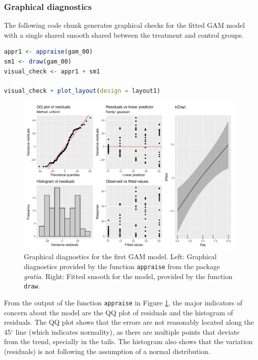 \documentclass[
]{article}
\newcommand{\passthrough}[1]{#1}
\begin{document}
\hypertarget{graphical-diagnostics}{%
\subsubsection{Graphical diagnostics}\label{graphical-diagnostics}}

The following code chunk generates graphical checks for the fitted GAM model with a single shared smooth shared between the treatment and control groups.

\begin{lstlisting}[language=R]
appr1 <- appraise(gam_00)
sm1 <- draw(gam_00)
visual_check <- appr1 + sm1

visual_check + plot_layout(design = layout1)
\end{lstlisting}

\begin{figure}

{\centering \includegraphics[width=0.75\linewidth]{Appendix_A_files/figure-latex/first-GAM-diag-1} 

}

\caption{Graphical diagnostics for the first GAM model. Left: Graphical diagnostics provided by the function \passthrough{\lstinline!appraise!} from the package \emph{gratia}. Right: Fitted smooth for the model, provided by the function \passthrough{\lstinline!draw!}.}\label{fig:first-GAM-diag}
\end{figure}



From the output of the function \passthrough{\lstinline!appraise!} in Figure \ref{fig:first-GAM-diag}, the major indicators of concern about the model are the QQ plot of residuals and the histogram of residuals. The QQ plot shows that the errors are not reasonably located along the 45\(^{\circ}\) line (which indicates normality), as there are multiple points that deviate from the trend, specially in the tails. The histogram also shows that the variation (residuals) is not following the assumption of a normal distribution.
\end{document}
